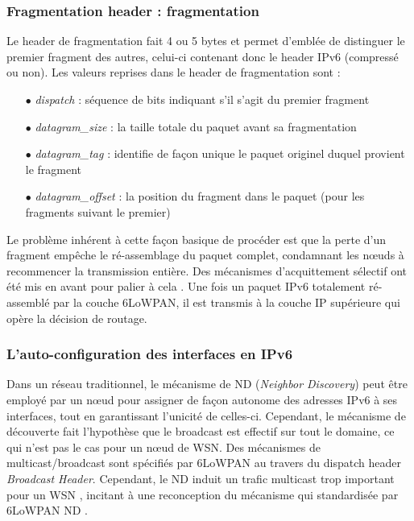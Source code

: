 \documentclass[]{report}
\begin{document}
\newpage

\subsubsection{Fragmentation header : fragmentation}

\par Le header de fragmentation fait 4 ou 5 bytes et permet d'emblée de distinguer le premier fragment  des autres, celui-ci contenant donc le header IPv6 (compressé ou non). Les valeurs reprises dans le header de fragmentation sont :
\vspace{0.2cm}
\begin{itemize}
\item[$\bullet$] \textit{dispatch} : séquence de bits indiquant s'il s'agit du premier fragment
\vspace{0.1cm}
\item[$\bullet$] \textit{datagram\_size} : la taille totale du paquet avant sa fragmentation
\vspace{0.1cm}
\item[$\bullet$] \textit{datagram\_tag} : identifie de façon unique le paquet originel duquel provient le fragment
\vspace{0.1cm}
\item[$\bullet$] \textit{datagram\_offset} : la position du fragment dans le paquet (pour les fragments suivant le premier)
\end{itemize}

\vspace{0.4cm}

\par Le problème inhérent à cette façon basique de procéder est que la perte d'un fragment empêche le ré-assemblage du paquet complet, condamnant les nœuds à recommencer la transmission entière. Des mécanismes d'acquittement sélectif ont été mis en avant pour palier à cela \cite{ietf-6tisch-architecture-28} \cite{wiki:6LoWPAN}. Une fois un paquet IPv6 totalement ré-assemblé par la couche 6LoWPAN, il est transmis à la couche IP supérieure qui opère la décision de routage.

\subsubsection{L'auto-configuration des interfaces en IPv6}

\par Dans un réseau traditionnel, le mécanisme de ND (\textit{Neighbor Discovery}) peut être employé par un nœud pour assigner de façon autonome des adresses IPv6 à ses interfaces, tout en garantissant l'unicité de celles-ci. Cependant, le mécanisme de découverte fait l'hypothèse que le broadcast est effectif sur tout le domaine, ce qui n'est pas le cas pour un nœud de WSN. Des mécanismes de multicast/broadcast sont spécifiés par 6LoWPAN au travers du dispatch header \textit{Broadcast Header}. Cependant, le ND induit un trafic multicast trop important pour un WSN \cite{wiki:6LoWPAN}, incitant à une reconception du mécanisme qui standardisée par 6LoWPAN ND \cite{rfc6775}.\\
\end{document}
